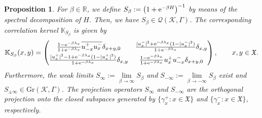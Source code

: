 \documentclass[pdftex]{sigma}
\numberwithin{equation}{section}
\newtheorem{Proposition}[Theorem]{Proposition}
 { \theoremstyle{definition}
\newtheorem{Definition}[Theorem]{Definition}
\newtheorem{Example}[Theorem]{Example}
\newtheorem{Remark}[Theorem]{Remark} }
\newcommand{\mfrak}[1]{\mathfrak{#1}}
\newcommand{\mcal}[1]{\mathcal{#1}}
\newcommand{\mbb}[1]{\mathbb{#1}}
\newcommand{\mrm}[1]{\mathrm{#1}}
\begin{document}
\begin{Proposition}
For $\beta\in \mbb{R}$, we define $S_{\beta}:=\big(1+{\rm e}^{-\beta H}\big)^{-1}$ by means of the spectral decomposition of $H$. Then, we have $S_{\beta}\in \mcal{Q}(\mcal{K},\Gamma)$. The corresponding correlation kernel $\mbb{K}_{S_{\beta}}$ is given by
\begin{gather*}
	\mbb{K}_{S_{\beta}}(x,y)=\left(
	\begin{matrix}
		\frac{1-{\rm e}^{-\beta\lambda_{x}}}{1+{\rm e}^{-\beta\lambda_{x}}}\overline{u^{+}_{-x}u^{-}_{x}}\delta_{x+y,0} & \frac{|u^{-}_{x}|^{2}+{\rm e}^{-\beta\lambda_{x}}(1-|u^{-}_{x}|^{2})}{1+{\rm e}^{-\beta\lambda_{x}}}\delta_{x,y} \vspace{1mm}\\
		\frac{|u^{+}_{x}|^{2}-1+{\rm e}^{-\beta\lambda_{x}}(1-|u^{+}_{x}|^{2})}{1+{\rm e}^{-\beta\lambda_{x}}}\delta_{x,y} & \frac{1-{\rm e}^{-\beta\lambda_{x}}}{1+{\rm e}^{-\beta\lambda_{x}}}u^{+}_{x}u^{-}_{-x}\delta_{x+y,0}
	\end{matrix}
	\right), \qquad x,y\in \mfrak{X}.
\end{gather*}
Furthermore, the weak limits $S_{\infty}:=\lim\limits_{\beta\to\infty}S_{\beta}$ and $S_{-\infty}:=\lim\limits_{\beta\to-\infty}S_{\beta}$ exist and $S_{\pm\infty}\in\mrm{Gr}(\mcal{K},\Gamma)$.
The projection operators $S_{\infty}$ and $S_{-\infty}$ are the orthogonal projection onto the closed subspaces generated by $\big\{\gamma^{+}_{x}\colon x\in\mfrak{X}\}$ and $\big\{\gamma^{-}_{x}\colon x\in\mfrak{X}\}$, respectively.
\end{Proposition}
\end{document}

